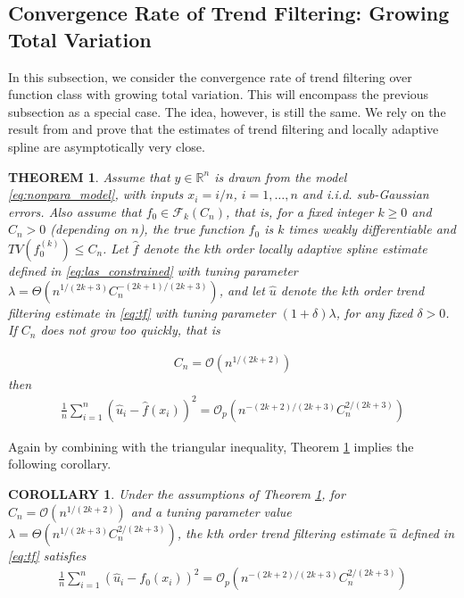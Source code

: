 \documentclass[a4paper]{article}
\newtheorem{theorem}{THEOREM}
\newtheorem{corollary}{COROLLARY}
\newcommand{\RR}{\mathbb{R}}
\renewcommand{\cal}{\mathcal}
\begin{document}
\subsection{Convergence Rate of Trend Filtering: Growing Total Variation}
In this subsection, we consider the convergence rate of trend filtering over function class with growing total variation. This will encompass the previous subsection as a special case. The idea, however, is still the same. We rely on the result from \cite{mammen1997locally} and prove that the estimates of trend filtering and locally adaptive spline are asymptotically very close.

\begin{theorem}
Assume that $y\in\RR^n$ is drawn from the model \eqref{eq:nonpara_model}, with inputs $x_i = i/n$, $i=1,\ldots, n$ and i.i.d. sub-Gaussian errors. Also assume that $f_0\in\cal{F}_k(C_n)$, that is, for a fixed integer $k\geq 0$ and $C_n > 0$ (depending on $n$), the true function $f_0$ is $k$ times weakly differentiable and $TV(f^{(k)}_0)\leq C_n$. Let $\hat{f}$ denote the $k$th order locally adaptive spline estimate defined in \eqref{eq:las_constrained} with tuning parameter $\lambda = \Theta(n^{1/(2k+3)}C_n^{-(2k+1)/(2k+3)})$, and let $\hat{u}$ denote the $k$th order trend filtering estimate in \eqref{eq:tf} with tuning parameter $(1+\delta)\lambda$, for any fixed $\delta >0$. If $C_n$ does not grow too quickly, that is

\begin{align}
C_n = \cal{O}(n^{1/(2k+2)})
\label{eq:tv_rate}
\end{align}
then
\begin{align*}
\frac{1}{n}\sum_{i=1}^n(\hat{u}_i - \hat{f}(x_i))^2 = \cal{O}_p(n^{-(2k+2)/(2k+3)}C_n^{2/(2k+3)})
\end{align*}
\label{thm:2}
\end{theorem}

Again by combining with the triangular inequality, Theorem \ref{thm:2} implies the following corollary.

\begin{corollary}
Under the assumptions of Theorem \ref{thm:2}, for $C_n = \cal{O}(n^{1/(2k+2)})$ and a tuning parameter value $\lambda = \Theta(n^{1/(2k+3)}C_n^{2/(2k+3)})$, the $k$th order trend filtering estimate $\hat{u}$ defined in \eqref{eq:tf} satisfies
\begin{align*}
\frac{1}{n}\sum_{i=1}^n(\hat{u}_i - f_0(x_i))^2 = \cal{O}_p(n^{-(2k+2)/(2k+3)}C_n^{2/(2k+3)})
\end{align*}
\label{cor:2}
\end{corollary}
\end{document}
